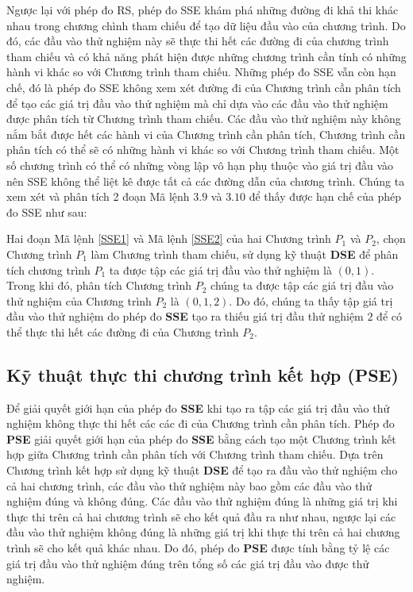 Ngược lại với phép đo RS, phép đo SSE khám phá những đường đi khả thi khác nhau trong chương chình tham chiếu để tạo dữ liệu đầu vào của chương trình. Do đó, các đầu vào thử nghiệm này sẽ thực thi hết các đường đi của chương trình tham chiếu và có khả năng phát hiện được những chương trình cần tính có những hành vi khác so với Chương trình tham chiếu. Những phép đo SSE vẫn còn hạn chế, đó là phép đo SSE không xem xét đường đi của Chương trình cần phân tích để tạo các giá trị đầu vào thử nghiệm mà chỉ dựa vào các đầu vào thử nghiệm được phân tích từ Chương trình tham chiếu. Các đầu vào thử nghiệm này không nắm bắt được hết các hành vi của Chương trình cần phân tích, Chương trình cần phân tích có thể sẽ có những hành vi khác so với Chương trình tham chiếu. Một số chương trình có thể có những vòng lập vô hạn phụ thuộc vào giá trị đầu vào nên SSE không thể liệt kê được tất cả các đường dẫn của chương trình. Chúng ta xem xét và phân tích 2 đoạn Mã lệnh $3.9$ và $3.10$ để thấy được hạn chế của phép đo SSE như sau:

{\scriptsize \begin{minipage}[t]{0.45\linewidth}
	
\end{minipage}
\hfill\vrule\hfill
\begin{minipage}[t]{0.45\linewidth}
	
\end{minipage}}

Hai đoạn Mã lệnh \ref{SSE1} và Mã lệnh \ref{SSE2} của hai Chương trình $P_{1}$ và $P_{2}$, chọn Chương trình $P_{1}$ làm Chương trình tham chiếu, sử dụng kỹ thuật \textbf{DSE} để phân tích chương trình $P_{1}$ ta được tập các giá trị đầu vào thử nghiệm là ${(0, 1)}$. Trong khi đó, phân tích Chương trình $P_{2}$ chúng ta được tập các giá trị đầu vào thử nghiệm của Chương trình $P_{2}$  là ${(0, 1, 2)}$. Do đó, chúng ta thấy tập giá trị đầu vào thử nghiệm do phép đo \textbf{SSE} tạo ra thiếu giá trị đầu thử nghiệm $2$ để có thể thực thi hết các đường đi của Chương trình $P_{2}$.

\subsection{Kỹ thuật thực thi chương trình kết hợp (PSE)}
Để giải quyết giới hạn của phép đo \textbf{SSE} khi tạo ra tập các giá trị đầu vào thử nghiệm không thực thi hết các các đi của Chương trình cần phân tích. Phép đo \textbf{PSE} giải quyết giới hạn của phép đo \textbf{SSE} bằng cách tạo một Chương trình kết hợp giữa Chương trình cần phân tích với Chương trình tham chiếu. Dựa trên Chương trình kết hợp sử dụng kỹ thuật \textbf{DSE} để tạo ra đầu vào thử nghiệm cho cả hai chương trình, các đầu vào thử nghiệm này bao gồm các đầu vào thử nghiệm đúng và không đúng. Các đầu vào thử nghiệm đúng là những giá trị khi thực thi trên cả hai chương trình sẽ cho kết quả đầu ra như nhau, ngược lại các đầu vào thử nghiệm không đúng là những giá trị khi thực thi trên cả hai chương trình sẽ cho kết quả khác nhau. Do đó, phép đo \textbf{PSE} được tính bằng tỷ lệ các giá trị đầu vào thử nghiệm đúng trên tổng số các giá trị đầu vào được thử nghiệm. 

